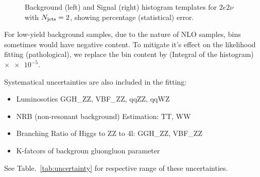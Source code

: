 \begin{figure}[hb]
    \begin{center}
    \end{center}
    \caption{Background (left) and Signal (right) histogram templates for $2e2\nu$ with $N_\mathrm{jets} = 2$, showing
    percentage (statistical) error.}
    \label{fig:templates_demo}
\end{figure}

For low-yield background samples, due to the nature of NLO samples, bins sometimes would have negative
content. To mitigate it's effect on the likelihood fitting (pathological), we replace the bin content
by (Integral of the histogram) $\times \num{e-5}$.

Systematical uncertainties are also included in the fitting:
\begin{itemize}
    \item Luminosoties GGH\_ZZ, VBF\_ZZ, qqZZ, qqWZ
    \item NRB (non-resonant background) Estimation: TT, WW
    \item Branching Ratio of Higgs to ZZ to 4l: GGH\_ZZ, VBF\_ZZ
    \item K-fatcors of backgroun gluongluon parameter
\end{itemize}
See Table.~\ref{tab:uncertainty} for respective range of these uncertainties.
